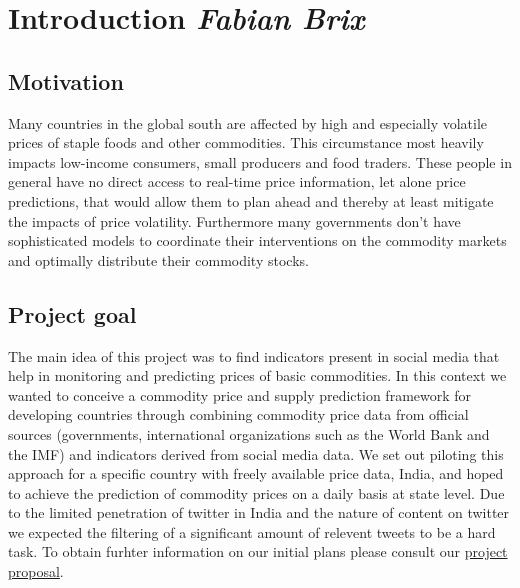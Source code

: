 \section*{Introduction \footnotesize\emph{Fabian Brix}}
\subsection*{Motivation}
Many countries in the global south are affected by high and especially volatile prices of staple foods and other commodities. This circumstance most heavily impacts low-income consumers, small producers and food traders. These people in general have no direct access to real-time price information, let alone price predictions, that would allow them to plan ahead and thereby at least mitigate the impacts of price volatility. Furthermore many governments don't have sophisticated models to coordinate their interventions on the commodity markets and optimally distribute their commodity stocks.

\subsection*{Project goal}
The main idea of this project was to find indicators present in social media that help in monitoring and predicting prices of basic commodities. In this context we wanted to conceive a commodity price and supply prediction framework for developing countries through combining commodity price data from official sources (governments, international organizations such as the World Bank and the IMF) and indicators derived from social media data. We set out piloting this approach for a specific country with freely available price data, India, and hoped to achieve the prediction of commodity prices on a daily basis at state level. Due to the limited penetration of twitter in India and the nature of content on twitter we expected the filtering of a significant amount of relevent tweets to be a hard task. To obtain furhter information on our initial plans please consult our \href{http://wiki.epfl.ch/predicting-commodity-prices.big-data/proposal}{project proposal}.
